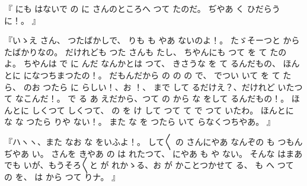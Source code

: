 
『
にも
はないで
の
に
さんのところへ
つて
たのだ。
ぢやあ
く
ひだらうに！。
』

『いゝえ
さん、
つたばかしで、
りも
も
やあ
ないのよ！。
たゞそーつと
から
たばかりなの。
だけれども
つた
さんも
たし、
ちやんにも
つて
を
て
たのよ。
ちやんは
で
に
んだ
なんかとは
つて、
きさうな
を
て
るんだもの、
ほんとに
になつちまつたの！。
だもんだから
の
の
の
で、
でつい
いて
を
て
たら、
のお
つたら
に
らしい！、お
！、
まで
して
るだけえ？、だけれど
いたつて
なこんだ！。
で
る
あ
えだから、つて
の
から
な
をして
るんだもの！。
ほんとに
しくつて
しくつて、
の
を
け
して
つて
て
で
つて
いたわ。
ほんとに
な
な
つたら
りや
ない！。
また
な
を
つたら
いて
らなくつちやあ。
』

『ハヽヽ、また
なお
な
をいふよ！。
して〳〵
の
さんにやあ
なんぞの
も
つもんぢやあ
い。
さんを
きやあ
の
は
れたつて、
にやあ
も
や
ない。
そんな
はまあ
でも
いが、もうそろ〳〵と
が
れかゝる、お
が
かことつかせて
る、
も
へ
つて
の
を、
は
から
つて
りナ。
』

